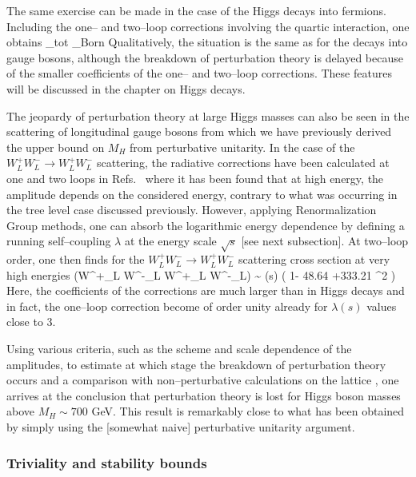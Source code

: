 The same exercise can be made in the case of the Higgs decays into
fermions. Including the one-- and two--loop corrections involving
the quartic interaction, one obtains \cite{rho-Veltman,Pert-Hfcplg2}
\beq
\Gamma_{\rm tot} \simeq \Gamma_{\rm Born}  
\eeq
Qualitatively, the situation is the same as for the decays into gauge bosons,
although the breakdown of perturbation theory is delayed because of the
smaller coefficients of the one-- and two--loop corrections. These features 
will be discussed in the chapter on Higgs decays. \s

The jeopardy of perturbation theory at large Higgs masses can also be seen in 
the scattering of longitudinal gauge bosons from which we have previously 
derived the upper bound on $M_H$ from perturbative unitarity. In the case of
the $W^+_L W^-_L \to W^+_L W^-_L$ scattering, the radiative corrections have 
been calculated at one and two loops in Refs.~\cite{RC-unitarity,WL-2loop} 
where it has been found that at high energy, the amplitude depends on the 
considered energy, contrary to what was occurring in the tree level case 
discussed 
previously. However, applying Renormalization Group methods, one can absorb the
logarithmic energy dependence by defining a running self--coupling $\lambda$ at
the energy scale $\sqrt{s}$ [see next subsection]. At two--loop order, one then
finds for the $W^+_L W^-_L \to W^+_L W^-_L$ scattering cross section at very
high energies \cite{WL-2loop}
\beq
\sigma (W^+_L W^-_L \to W^+_L W^-_L) \sim {} \hat \lambda (s)
\left( 1- 48.64 \hat \lambda +333.21  \hat \lambda^2 \right)
\eeq
Here, the coefficients of the corrections are much larger than in Higgs decays
and in fact, the one--loop correction become of order unity already for $
\lambda (s)$ values close to 3. \s 

Using various criteria, such as the scheme and scale dependence of the
amplitudes, to estimate at which stage the breakdown of perturbation theory
occurs \cite{WL-2loop2} and a comparison with non--pertur\-ba\-ti\-ve
calculations on the lattice \cite{WL-lattice}, one arrives at the conclusion
that perturbation theory is lost for Higgs boson masses above $M_H \sim 700$
GeV. This result is remarkably close to what has been obtained by simply using
the [somewhat naive] perturbative unitarity argument.  

\subsubsection{Triviality and stability bounds}
 
